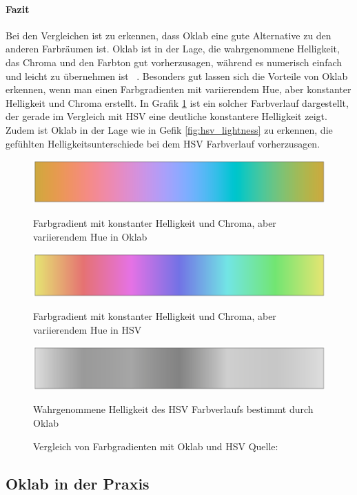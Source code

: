 \documentclass[12pt, a4paper, ngerman]{article}
\begin{document}
\paragraph{Fazit}
Bei den Vergleichen ist zu erkennen, dass Oklab eine gute Alternative zu den anderen Farbräumen ist.
Oklab ist in der Lage, die wahrgenommene Helligkeit, das Chroma und den Farbton gut vorherzusagen, 
während es numerisch einfach und leicht zu übernehmen ist ~\cite{Oklab_2020}.
Besonders gut lassen sich die Vorteile von Oklab erkennen, 
wenn man einen Farbgradienten mit variierendem Hue, aber konstanter Helligkeit und Chroma erstellt. 
In Grafik \ref{fig:oklab_hsv} ist ein solcher Farbverlauf dargestellt, der gerade im Vergleich mit HSV eine deutliche konstantere Helligkeit zeigt. 
Zudem ist Oklab in der Lage wie in Gefik \ref{fig:hsv_lightness} zu erkennen, die gefühlten Helligkeitsunterschiede bei dem HSV Farbverlauf vorherzusagen.

\begin{figure}
  \centering
  \includegraphics[width=0.5\linewidth]{Grafiken/Oklab_HSV/hue_oklab.png}
  \caption{Farbgradient mit konstanter Helligkeit und Chroma, aber variierendem Hue in Oklab}
  \label{fig:hue_oklab}
  
  \includegraphics[width=0.5\linewidth]{Grafiken/Oklab_HSV/hue_hsv.png}
  \caption{Farbgradient mit konstanter Helligkeit und Chroma, aber variierendem Hue in HSV}
  \label{fig:hue_hsv}
  
  \includegraphics[width=0.5\linewidth]{Grafiken/Oklab_HSV/hue_hsv_lightness.png}
  \caption{Wahrgenommene Helligkeit des HSV Farbverlaufs bestimmt durch Oklab}
  \label{fig:hsv_lightness}
  
  \caption{Vergleich von Farbgradienten mit Oklab und HSV Quelle: ~\cite{Oklab_2020}}
  \label{fig:oklab_hsv}
\end{figure}

\subsection{Oklab in der Praxis}

\newpage
\printbibliography
\end{document}
